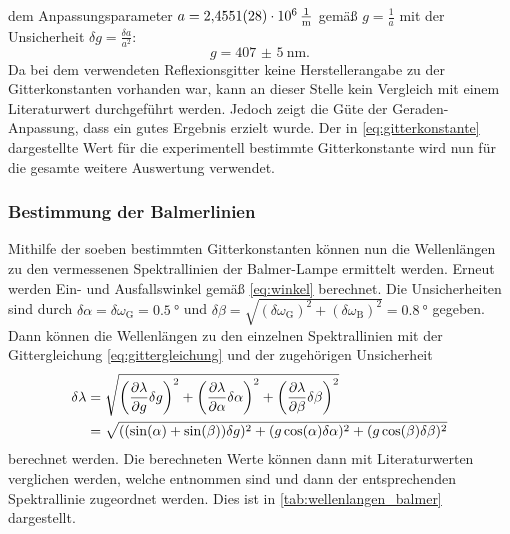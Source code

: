 dem Anpassungsparameter $a = \SI{2,4551(28)e6}{\frac{1}{\meter}}$ gemäß $g = \frac{1}{a}$ mit der Unsicherheit $\delta g = \frac{\delta a}{a^2}$:
\begin{equation}\label{eq:gitterkonstante}
    g = \SI{407(5)}{\nano \meter} .
\end{equation} Da bei dem verwendeten Reflexionsgitter keine Herstellerangabe zu der Gitterkonstanten vorhanden war, kann an dieser Stelle kein Vergleich mit einem
Literaturwert durchgeführt werden. Jedoch zeigt die Güte der Geraden-Anpassung, dass ein gutes Ergebnis erzielt wurde. Der in \cref{eq:gitterkonstante} dargestellte
Wert für die experimentell bestimmte Gitterkonstante wird nun für die gesamte weitere Auswertung verwendet.

\subsubsection{Bestimmung der Balmerlinien}\label{subsubsec:balmerlinien}
Mithilfe der soeben bestimmten Gitterkonstanten können nun die Wellenlängen zu den vermessenen Spektrallinien der Balmer-Lampe ermittelt werden. Erneut werden
Ein- und Ausfallswinkel gemäß \cref{eq:winkel} berechnet. Die Unsicherheiten sind durch $\delta \alpha = \delta \omega_{\mathrm{G}} = \SI{0,5}{\degree}$
und $\delta \beta = \sqrt{(\delta \omega_{\mathrm{G}})^2 + (\delta \omega_{\mathrm{B}})^2} = \SI{0,8}{\degree}$ gegeben. Dann können die Wellenlängen zu den einzelnen
Spektrallinien mit der Gittergleichung \ref{eq:gittergleichung} und der zugehörigen Unsicherheit
\begin{align*}
    \delta \lambda &= \sqrt{\left(\pdv{\lambda}{g} \delta g\right)^2 + \left(\pdv{\lambda}{\alpha} \delta \alpha\right)^2 + \left(\pdv{\lambda}{\beta} \delta \beta\right)^2} \\
    &= \sqrt{((\sin(\alpha) + \sin(\beta)) \delta g)^2 + (g \cos(\alpha) \delta \alpha)^2 + (g \cos(\beta) \delta \beta)^2}
\end{align*} berechnet werden. Die berechneten Werte können dann mit Literaturwerten verglichen werden, welche \cite{balmer_handblatt} entnommen sind und dann der entsprechenden
Spektrallinie zugeordnet werden. Dies ist in \cref{tab:wellenlangen_balmer} dargestellt.
